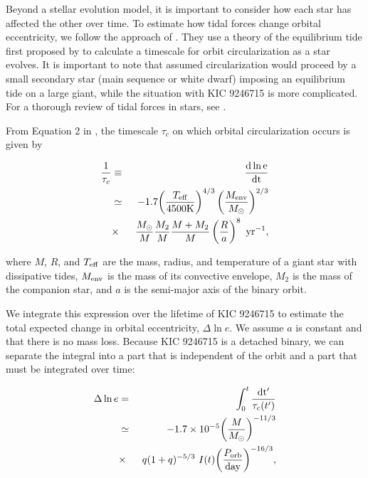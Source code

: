 Beyond a stellar evolution model, it is important to consider how each star has affected the other over time. To estimate how tidal forces change orbital eccentricity, we follow the approach of \citet{ver95}. They use a theory of the equilibrium tide first proposed by \citet{zah77} to calculate a timescale for orbit circularization as a star evolves. It is important to note that \citet{ver95} assumed circularization would proceed by a small secondary star (main sequence or white dwarf) imposing an equilibrium tide on a large giant, while the situation with KIC 9246715 is more complicated. For a thorough review of tidal forces in stars, see \citet{ogi14}.

From Equation 2 in \citet{ver95}, the timescale $\tau_c$ on which orbital circularization occurs is given by

\begin{eqnarray}
\frac{1}{\tau_c} & \equiv &
\frac{\rm{d} \ln e}{\rm{d}t} \nonumber \\
& \simeq & -1.7 {\left( \frac{T_{\rm{eff}}}{4500 \rm{K}} \right)}^{4/3} \left( \frac{M_{\rm{env}}}{M_{\odot}} \right)^{2/3} \\
& \times & \ \frac{M_{\odot}}{M} \frac{M_2}{M} \frac{M+M_2}{M} \left( \frac{R}{a} \right)^8 \ \rm{yr}^{-1}, \nonumber
\end{eqnarray}

\noindent where $M$, $R$, and $T_{\rm{eff}}$ are the mass, radius, and temperature of a giant star with dissipative tides, $M_{\rm{env}}$ is the mass of its convective envelope, $M_2$ is the mass of the companion star, and $a$ is the semi-major axis of the binary orbit.

We integrate this expression over the lifetime of KIC 9246715 to estimate the total expected change in orbital eccentricity, $\Delta \ln e$. We assume $a$ is constant and that there is no mass loss. Because KIC 9246715 is a detached binary, we can separate the integral into a part that is independent of the orbit and a part that must be integrated over time:

\begin{eqnarray}\label{tide1}
\Delta \ln e  & = &
\int_0^t \frac{\rm{d}t'}{\tau_c(t')} \nonumber \\
& \simeq & -1.7 \times 10^{-5} {\left( \frac{M}{M_{\odot}} \right)}^{-11/3} \\
& \times & \ q(1+q)^{-5/3} \ I(t) {\left( \frac{P_{\rm{orb}}}{\rm{day}} \right)}^{-16/3}, \nonumber
\end{eqnarray}

